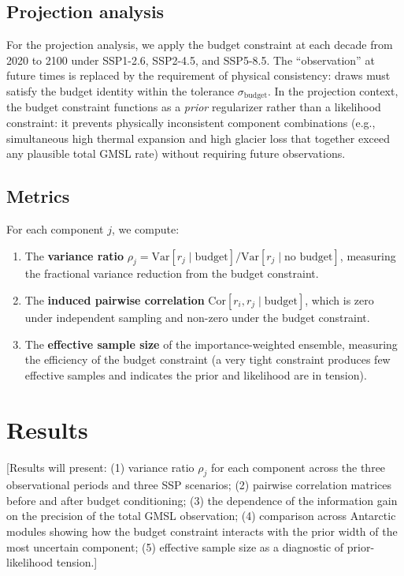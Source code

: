 \documentclass[11pt]{article}
\begin{document}
\subsection{Projection analysis}

For the projection analysis, we apply the budget constraint at each decade from 2020 to 2100 under SSP1-2.6, SSP2-4.5, and SSP5-8.5.  The ``observation'' at future times is replaced by the requirement of physical consistency: draws must satisfy the budget identity within the tolerance $\sigma_{\text{budget}}$.  In the projection context, the budget constraint functions as a \emph{prior} regularizer rather than a likelihood constraint: it prevents physically inconsistent component combinations (e.g., simultaneous high thermal expansion and high glacier loss that together exceed any plausible total GMSL rate) without requiring future observations.

\subsection{Metrics}

For each component $j$, we compute:
\begin{enumerate}
  \item The \textbf{variance ratio} $\rho_j = \text{Var}[r_j \mid \text{budget}] / \text{Var}[r_j \mid \text{no budget}]$, measuring the fractional variance reduction from the budget constraint.
  \item The \textbf{induced pairwise correlation} $\text{Cor}[r_i, r_j \mid \text{budget}]$, which is zero under independent sampling and non-zero under the budget constraint.
  \item The \textbf{effective sample size} of the importance-weighted ensemble, measuring the efficiency of the budget constraint (a very tight constraint produces few effective samples and indicates the prior and likelihood are in tension).
\end{enumerate}


\section{Results}
\label{sec:results}

[Results will present: (1) variance ratio $\rho_j$ for each component across the three observational periods and three SSP scenarios; (2) pairwise correlation matrices before and after budget conditioning; (3) the dependence of the information gain on the precision of the total GMSL observation; (4) comparison across Antarctic modules showing how the budget constraint interacts with the prior width of the most uncertain component; (5) effective sample size as a diagnostic of prior-likelihood tension.]
\end{document}
